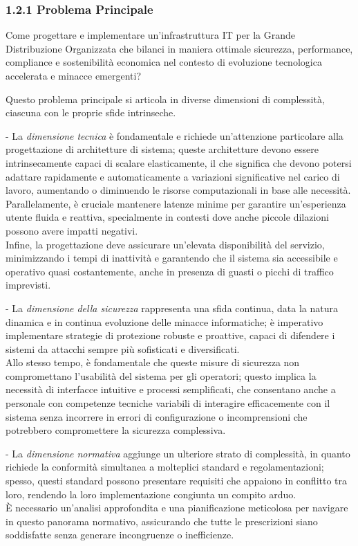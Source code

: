 \documentclass{report}
\begin{document}
\subsubsection{\texorpdfstring{\textbf{1.2.1 Problema
Principale}}{1.2.1 Problema Principale}}\label{problema-principale}

Come progettare e implementare un'infrastruttura IT per la Grande
Distribuzione Organizzata che bilanci in maniera ottimale sicurezza,
performance, compliance e sostenibilità economica nel contesto di
evoluzione tecnologica accelerata e minacce emergenti?

Questo problema principale si articola in diverse dimensioni di
complessità, ciascuna con le proprie sfide intrinseche.

- La \emph{dimensione tecnica} è fondamentale e richiede un'attenzione
particolare alla progettazione di architetture di sistema; queste
architetture devono essere intrinsecamente capaci di scalare
elasticamente, il che significa che devono potersi adattare rapidamente
e automaticamente a variazioni significative nel carico di lavoro,
aumentando o diminuendo le risorse computazionali in base alle
necessità.\\
Parallelamente, è cruciale mantenere latenze minime per garantire
un'esperienza utente fluida e reattiva, specialmente in contesti dove
anche piccole dilazioni possono avere impatti negativi.\\
Infine, la progettazione deve assicurare un'elevata disponibilità del
servizio, minimizzando i tempi di inattività e garantendo che il sistema
sia accessibile e operativo quasi costantemente, anche in presenza di
guasti o picchi di traffico imprevisti.

- La \emph{dimensione della sicurezza} rappresenta una sfida continua,
data la natura dinamica e in continua evoluzione delle minacce
informatiche; è imperativo implementare strategie di protezione robuste
e proattive, capaci di difendere i sistemi da attacchi sempre più
sofisticati e diversificati.\\
Allo stesso tempo, è fondamentale che queste misure di sicurezza non
compromettano l'usabilità del sistema per gli operatori; questo implica
la necessità di interfacce intuitive e processi semplificati, che
consentano anche a personale con competenze tecniche variabili di
interagire efficacemente con il sistema senza incorrere in errori di
configurazione o incomprensioni che potrebbero compromettere la
sicurezza complessiva.

- La \emph{dimensione normativa} aggiunge un ulteriore strato di
complessità, in quanto richiede la conformità simultanea a molteplici
standard e regolamentazioni; spesso, questi standard possono presentare
requisiti che appaiono in conflitto tra loro, rendendo la loro
implementazione congiunta un compito arduo.\\
È necessario un'analisi approfondita e una pianificazione meticolosa per
navigare in questo panorama normativo, assicurando che tutte le
prescrizioni siano soddisfatte senza generare incongruenze o
inefficienze.
\end{document}
